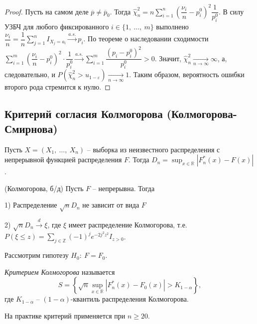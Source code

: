 \begin{proof}
    Пусть на самом деле $\displaystyle \overline{p} \neq \overline{p}_{0}$. Тогда $\displaystyle \hat{\chi }_{n}^{2} =n\sum _{i=1}^{n}\left(\dfrac{\nu _{i}}{n} -p_{i}^{0}\right)^{2}\dfrac{1}{p_{i}^{0}}$. В силу УЗБЧ для любого фиксированного $\displaystyle i\in \{1,\ \dotsc ,\ m\}$ выполнено $\displaystyle \dfrac{\nu _{i}}{n} =\dfrac{1}{n}\sum _{j=1}^{n} I_{X_{j} =a_{i}}\xrightarrow{a.s.} p_{i}$. По теореме о наследовании сходимости $\displaystyle \sum _{i=1}^{m}\left(\dfrac{\nu _{i}}{n} -p_{i}^{0}\right)^{2} \cdotp \dfrac{1}{p_{i}^{0}}\xrightarrow{a.s.}\sum _{i=1}^{m}\dfrac{\left( p_{i} -p_{i}^{0}\right)^{2}}{p_{i}^{0}}  >0$. Значит, $\displaystyle \hat{\chi }_{n}^{2}\xrightarrow[n\rightarrow \infty ]{} \infty $, а, следовательно, и $\displaystyle P\left(\hat{\chi }_{n}^{2}  >u_{1-\varepsilon }\right)\xrightarrow[n\rightarrow \infty ]{} 1$. Таким образом, вероятность ошибки второго рода стремится к нулю.
\end{proof}
\subsection{Критерий согласия Колмогорова (Колмогорова-Смирнова)}

Пусть $\displaystyle X=( X_{1} ,\ \dotsc ,\ X_{n})$ -- выборка из неизвестного распределения с непрерывной функцией распределения $\displaystyle F$. Тогда $\displaystyle D_{n} =\sup _{x\in \mathbb{R}}\left| F_{n}^{*}( x) -F( x)\right| $.
\begin{theorem}
    (Колмогорова, б/д) Пусть $\displaystyle F$ -- непрерывна. Тогда
    
    1) Распределение $\displaystyle \sqrt{n} D_{n}$ не зависит от вида $\displaystyle F$
    
    2) $\displaystyle \sqrt{n} D_{n}\xrightarrow{d} \xi $, где $\displaystyle \xi $ имеет распределение Колмогорова, т.е. $\displaystyle P( \xi \leqslant z) =\sum _{j\in \mathbb{Z}}( -1)^{j} e^{-2j^{2} z^{2}} I_{z >0}$.
\end{theorem}
Рассмотрим гипотезу $\displaystyle H_{0} :\ F=F_{0}$.
\begin{definition}
    \textit{Критерием Колмогорова} называется
    \begin{equation*}
        S=\left\{\sqrt{n}\sup _{x\in \mathbb{R}}\left| F_{n}^{*}( x) -F_{0}( x)\right|  >K_{1-\alpha }\right\} ,
    \end{equation*}
    где $\displaystyle K_{1-\alpha }$ -- $\displaystyle ( 1-\alpha )$-квантиль распределения Колмогорова.
\end{definition}
\begin{note}
    На практике критерий применяется при $\displaystyle n\geqslant 20$.
\end{note}
